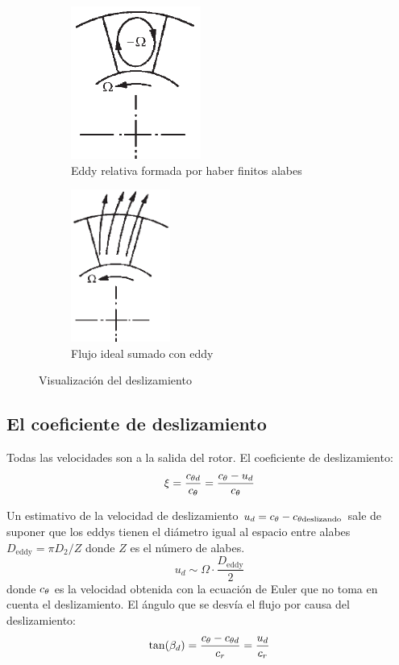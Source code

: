 \documentclass{article}
\begin{document}
\begin{figure}[htb!]
\centering
\begin{subfigure}{.49\textwidth}
\centering
\includegraphics[height=5cm]{fig/eddydeslizamiento.png}
\caption{Eddy relativa formada por haber finitos alabes}
\label{fig:deslizamientoEddy}
\end{subfigure}%
\begin{subfigure}{.49\textwidth}
\centering
\includegraphics[height= 5cm]{fig/deslizamientoconeddy.png}
\caption{Flujo ideal sumado con eddy}
\label{fig:deslizamientoEddyMasFlujoIdeal}
\end{subfigure}
\caption{Visualización del deslizamiento}
\label{fig:explicaciondeslizamiento}
\end{figure}

\subsection{El coeficiente de deslizamiento}
Todas las velocidades son a la salida del rotor. El coeficiente de deslizamiento:
\[
\xi = \frac{c_{\theta d}}{c_{\theta }} = \frac{c_{\theta }-u_d}{c_{\theta }}
\]

Un estimativo de la velocidad de deslizamiento $u_d= c_{\theta }-c_{\theta \mathrm{deslizando}}$ sale de suponer que los eddys tienen el diámetro igual al espacio entre alabes $D_{\mathrm{eddy}}= \pi D_{\mathrm{2}}/Z$ donde $Z$ es el número de alabes. 
\[
u_d \sim \Omega \cdot \frac{D_{\mathrm{eddy}}}{2}
\]
donde $c_{\theta }$ es la velocidad obtenida con la ecuación de Euler que no toma en cuenta el deslizamiento. El ángulo que se desvía el flujo por causa del deslizamiento:
\[
\tan (\beta_d) =\frac{c_{\theta }-c_{\theta d}}{c_{r }}= \frac{u_d}{c_{r }}
\]
\end{document}
